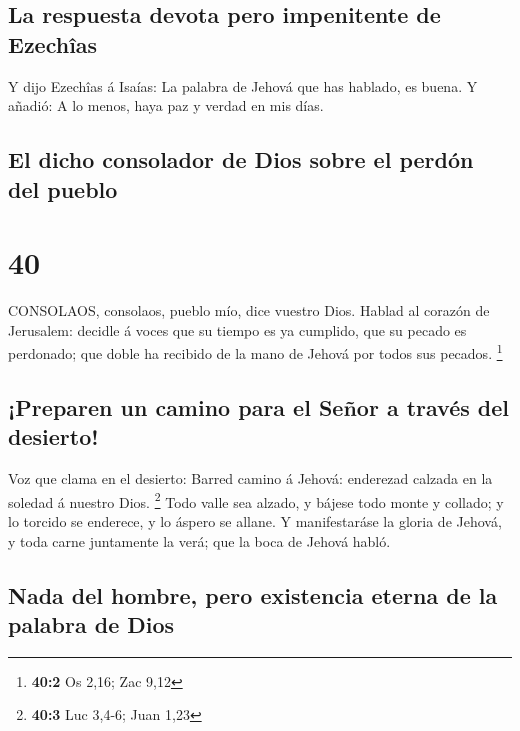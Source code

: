 \hypertarget{la-respuesta-devota-pero-impenitente-de-ezechuxeeas}{%
\subsection{La respuesta devota pero impenitente de
Ezechîas}\label{la-respuesta-devota-pero-impenitente-de-ezechuxeeas}}

 Y dijo Ezechîas á Isaías: La palabra de Jehová que has
hablado, es buena. Y añadió: A lo menos, haya paz y verdad en mis días.

\hypertarget{el-dicho-consolador-de-dios-sobre-el-perduxf3n-del-pueblo}{%
\subsection{El dicho consolador de Dios sobre el perdón del
pueblo}\label{el-dicho-consolador-de-dios-sobre-el-perduxf3n-del-pueblo}}

\hypertarget{section-39}{%
\section{40}\label{section-39}}

 CONSOLAOS, consolaos, pueblo mío, dice vuestro Dios.
 Hablad al corazón de Jerusalem: decidle á voces que su
tiempo es ya cumplido, que su pecado es perdonado; que doble ha recibido
de la mano de Jehová por todos sus pecados. \footnote{\textbf{40:2} Os
  2,16; Zac 9,12}

\hypertarget{preparen-un-camino-para-el-seuxf1or-a-travuxe9s-del-desierto}{%
\subsection{¡Preparen un camino para el Señor a través del
desierto!}\label{preparen-un-camino-para-el-seuxf1or-a-travuxe9s-del-desierto}}

 Voz que clama en el desierto: Barred camino á Jehová:
enderezad calzada en la soledad á nuestro Dios. \footnote{\textbf{40:3}
  Luc 3,4-6; Juan 1,23}  Todo valle sea alzado, y bájese
todo monte y collado; y lo torcido se enderece, y lo áspero se allane.
 Y manifestaráse la gloria de Jehová, y toda carne
juntamente la verá; que la boca de Jehová habló.

\hypertarget{nada-del-hombre-pero-existencia-eterna-de-la-palabra-de-dios}{%
\subsection{Nada del hombre, pero existencia eterna de la palabra de
Dios}\label{nada-del-hombre-pero-existencia-eterna-de-la-palabra-de-dios}}

